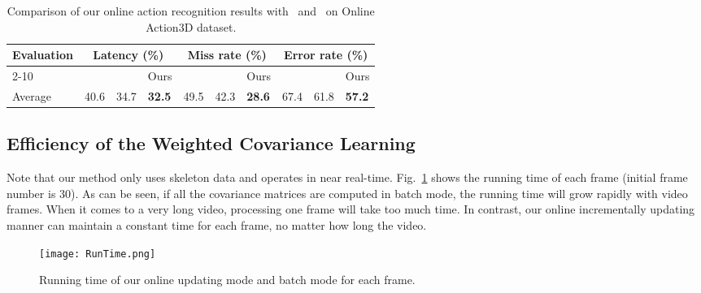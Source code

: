 \documentclass[sigconf]{acmart}
\begin{document}
\begin{table*}[!htbp]
\caption{Comparison of our online action recognition results with~\cite{kviatkovsky2014online} and~\cite{hussein2013human} on  Online Action3D dataset.}
\label{LMRResultsOnlineAction3DCompare}\centering
\begin{tabular}{|p{1.6cm}<{\centering}|p{0.5cm}<{\centering}|p{0.5cm}<{\centering}|p{0.6cm}<{\centering}|p{0.5cm}<{\centering}|p{0.5cm}<{\centering}|p{0.6cm}<{\centering}|p{0.5cm}<{\centering}|p{0.5cm}<{\centering}|p{0.6cm}<{\centering}|}
\hline
\multirow{3}{*}{Evaluation} & \multicolumn{3}{c|}{Latency (\%)} & \multicolumn{3}{c|}{Miss rate (\%)} & \multicolumn{3}{c|}{Error rate (\%)}\\
\cline{2-10}
& \cite{kviatkovsky2014online} & \cite{hussein2013human} & Ours & \cite{kviatkovsky2014online} & \cite{hussein2013human} & Ours & \cite{kviatkovsky2014online} & \cite{hussein2013human} & Ours \\
\hline
Average & 40.6 & 34.7 & \textbf{32.5}  & 49.5 & 42.3 &  \textbf{28.6} & 67.4 & 61.8 & \textbf{57.2}\\
\hline
\end{tabular}
\end{table*}


\subsection{Efficiency of the Weighted Covariance Learning}
Note that our method only uses skeleton data and operates in near real-time. Fig.~\ref{RunTime} shows the running time of each frame (initial frame number is 30). As can be seen, if all the covariance matrices are computed in batch mode, the running time will grow rapidly with video frames. When it comes to a very long video, processing one frame will take too much time. In contrast, our online incrementally updating manner can maintain a constant time for each frame, no matter how long the video.
\begin{figure}
  \centering
  \texttt{[image: RunTime.png]}\\
  \caption{Running time of our online updating mode and batch mode for each frame.}\label{RunTime}
\end{figure}
\end{document}
